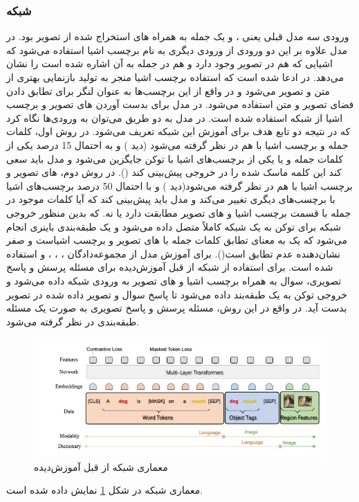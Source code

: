 \subsubsection{   شبکه }
	ورودی سه مدل قبلی یعنی 
	،
	و 
	یک جمله به همراه 
	های استخراج شده از تصویر بود. در مدل 
	علاوه بر این دو ورودی از ورودی دیگری به نام برچسب اشیا
	استفاده می‌شود که اشیایی که هم در تصویر وجود دارد و هم در جمله به آن اشاره شده است را نشان می‌دهد. در 
	\cite{li2020oscar}
ادعا شده است که استفاده برچسب اشیا منجر به تولید بازنمایی بهتری از متن و تصویر می‌شود و در واقع از این برچسب‌ها به عنوان لنگر برای تطابق دادن فضای تصویر و متن استفاده می‌شود. در مدل
	برای بدست آوردن 
	های تصویر و برچسب اشیا از شبکه 
	استفاده شده است. در مدل 
	به دو طریق می‌توان به ورود‌ی‌ها نگاه کرد که در نتیجه دو تابع هدف برای آموزش این شبکه تعریف می‌شود. در روش اول، کلمات جمله و برچسب اشیا با هم در نظر گرفته می‌شود (دید ) و به احتمال 15 درصد یکی از کلمات جمله و یا یکی از برچسب‌های اشیا با توکن 
	\lr{[MASK]}
	جایگزین می‌شود و مدل باید سعی کند این کلمه ماسک شده را در خروجی پیش‌بینی کند
	().
	در روش دوم،
	های تصویر و برچسب اشیا با هم در نظر گرفته می‌شود(دید ) و با احتمال 50 درصد برچسب‌های اشیا با برچسب‌های دیگری تغییر می‌کند و مدل باید پیش‌بینی کند که آیا کلمات موجود در جمله با قسمت برچسب اشیا و 
	های تصویر مطابقت دارد یا نه. که بدین منظور خروجی شبکه برای توکن
	\lr{[CLS]}
	به یک شبکه کاملاً متصل داده می‌شود و یک طبقه‌بندی باینری انجام می‌شود که یک به معنای تطابق کلمات جمله با 
	های تصویر و برچسب اشیاست و صفر نشان‌دهنده عدم تطابق است().  برای آموزش مدل 
	از مجموعه‌دادگان
	،
	،
	،
	و
	استفاده شده است. برای استفاده از شبکه از قبل آموزش‌دیده
	برای مسئله پرسش و پاسخ تصویری، سوال به همراه برچسب اشیا و 
	های تصویر به ورودی شبکه داده ‌می‌شود و خروجی توکن
	\lr{[CLS]}
	به یک طبقه‌بند داده ‌می‌شود تا پاسخ سوال و تصویر داده شده در تصویر بدست آید. در واقع در این روش، مسئله پرسش و پاسخ تصویری به صورت یک مسئله طبقه‌بندی در نظر گرفته ‌می‌شود.
	\begin{figure}
		\centerline{\includegraphics[scale=0.7]{images/OSCAR.JPG}}
		\caption[معماری شبکه از قبل آموزش‌دیده]{معماری شبکه از قبل آموزش‌دیده\cite{li2020oscar}}
		\label{fig:OSCAR}
	\end{figure}
	معماری شبکه 
	در شکل 
	\ref{fig:OSCAR}
	نمایش داده شده است.
	
